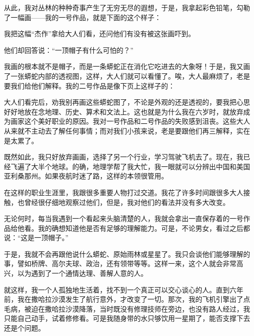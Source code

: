 {\startalignment[center]
 \stopalignment}

从此，我对丛林的种种奇事产生了无穷无尽的遐想，于是，我拿起彩色铅笔，勾勒了一幅画------我的一号作品，就是下面的这个样子：

{\startalignment[center]
 \stopalignment}

我把这幅“杰作”拿给大人们看，还问他们有没有被这张画吓到。

他们却回答说：“一顶帽子有什么可怕的？”

我画的根本就不是帽子，而是一条蟒蛇正在消化它吃进去的大象呀！于是，我又画了一张蟒蛇内部的透视图，这样，大人们就可以看懂了。唉，大人最麻烦了，老是要我们给他们解释。我的二号作品是像下页上这样子的：

大人们看完后，劝我别再画这些蟒蛇图了，不论是外观的还是透视的，要我把心思好好地放在念地理、历史、算术和文法上。这也就是为什么我在六岁时，就放弃成为画家这个美好职业的原因。我对一号作品和二号作品的失败感到沮丧。这些大人从来就不主动去了解任何事情；而对我们小孩来说，老是要跟他们再三解释，实在是太累了。

既然如此，我只好放弃画画，选择了另一个行业，学习驾驶飞机去了。现在，我已经飞遍了大半个地球。的确，地理学帮了我大忙，我一眼就可以分辨出中国和美国亚利桑那州。如果夜航时迷了路，这样的本领很管用。

在这样的职业生涯里，我跟很多重要人物打过交道。我花了许多时间跟很多大人接触，也曾经很仔细地观察过他们，但是，我对他们的看法并没有多大改变。

无论何时，每当我遇到一个看起来头脑清楚的人，我就会拿出一直保存着的一号作品给他看。我的确想知道他是否有足够的理解能力。可是，不论男女，看过之后都说：“这是一顶帽子。”

{\startalignment[center]
 \stopalignment}

于是，我就不会再跟他说什么蟒蛇、原始雨林或星星了。我只会谈他们能够理解的事，譬如桥牌、高尔夫球、政治，还有领带等等。这样一来，这个人就会非常高兴，以为遇到了一个通情达理、善解人意的人。


\stoptitle

\starttitle[title={2}]

就这样，我一个人孤独地生活着，找不到一个真正可以交心谈心的人。直到六年前，我在撒哈拉沙漠发生了航行意外，才改变了一切。那次，我的飞机引擎出了点毛病，被迫在撒哈拉沙漠降落，当时既没有修理技师在旁边，也没有路人经过，我只能自己动手，试着修修看。可是我随身带的水只够饮用一星期了，能否支撑下去还是个问题。

